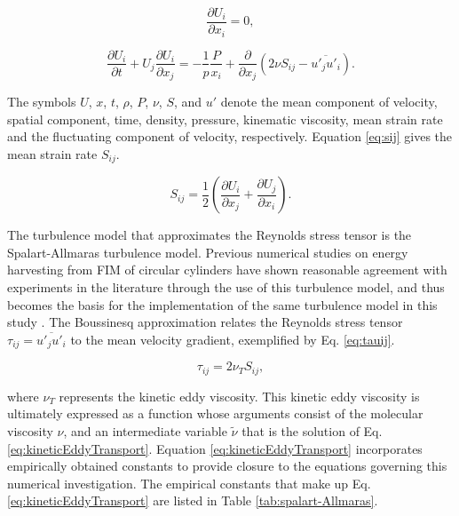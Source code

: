 \documentclass[oneside]{utmthesis}
\begin{document}
\begin{equation}
  \frac{\partial U_{i}}{\partial x_{i}}=0,
  \label{eq:continuity}
\end{equation}

\begin{equation}
  \frac{\partial U_{i}}{\partial t}+U_{j}\frac{\partial U_{i}}{\partial x_{j}} = -\frac{1}{p}\frac{P}{x_{i}}+\frac{\partial}{\partial x_{j}} \left( 2\nu S_{ij}-\overline{u'_{j}u'_{i}} \right).
  \label{eq:navier-stokes}
\end{equation}

\noindent The symbols $U$, $x$, $t$, $\rho$, $P$, $\nu$, $S$, and $u'$ denote the mean component of velocity, spatial component, time, density, pressure, kinematic viscosity, mean strain rate and the fluctuating component of velocity, respectively. Equation \ref{eq:sij} gives the mean strain rate $S_{ij}$.

\begin{equation}
  S_{ij} = \frac{1}{2} \left( \frac{\partial U_{i}}{\partial x_{j}} + \frac{\partial U_{j}}{\partial x_{i}} \right).
  \label{eq:sij}
\end{equation}

The turbulence model that approximates the Reynolds stress tensor is the Spalart-Allmaras turbulence model. Previous numerical studies on energy harvesting from FIM of circular cylinders have shown reasonable agreement with experiments in the literature through the use of this turbulence model, and thus becomes the basis for the implementation of the same turbulence model in this study \citep{Ding2015a,Ding2015b}. The Boussinesq approximation relates the Reynolds stress tensor $\tau_{ij} = \overline{u'_{j}u'_{i}}$ to the mean velocity gradient, exemplified by Eq. \ref{eq:tauij}.

\begin{equation}
  \tau_{ij} = 2 \nu_{T}S_{ij},
  \label{eq:tauij}
\end{equation}

\noindent where $\nu_{T}$ represents the kinetic eddy viscosity. This kinetic eddy viscosity is ultimately expressed as a function whose arguments consist of the molecular viscosity $\nu$, and an intermediate variable $\tilde{\nu}$ that is the solution of Eq. \ref{eq:kineticEddyTransport}. Equation \ref{eq:kineticEddyTransport} incorporates empirically obtained constants to provide closure to the equations governing this numerical investigation. The empirical constants that make up Eq. \ref{eq:kineticEddyTransport} are listed in Table \ref{tab:spalart-Allmaras}.
\end{document}
